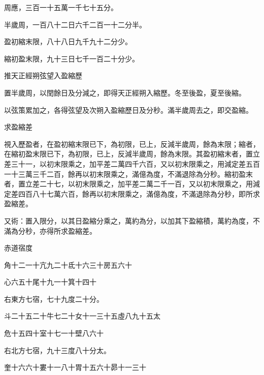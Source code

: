 \begin{pinyinscope}
 周應，三百一十五萬一千七十五分。



 半歲周，一百八十二日六千二百一十二分半。



 盈初縮末限，八十八日九千九十二分少。



 縮初盈末限，九十三日七千一百二十分少。



 推天正經朔弦望入盈縮歷



 置半歲周，以閏餘日及分減之，即得天正經朔入縮歷。冬至後盈，夏至後縮。



 以弦策累加之，各得弦望及次朔入盈縮歷日及分秒。滿半歲周去之，即交盈縮。



 求盈縮差



 視入歷盈者，在盈初縮末限已下，為初限，已上，反減半歲周，餘為末限；縮者，在縮初盈末限已下，為初限，已上，反減半歲周，餘為末限。其盈初縮末者，置立差三十一，以初末限乘之，加平差二萬四千六百，又以初末限乘之，用減定差五百一十三萬三千二百，餘再以初末限乘之，滿億為度，不滿退除為分秒。縮初盈末者，置立差二十七，以初末限乘之，加平差二萬二千一百，又以初末限乘之，用減定差四百八十七萬六百，餘再以初末限乘之，滿億為度，不滿退除為分秒，即所求盈縮差。



 又術：置入限分，以其日盈縮分乘之，萬約為分，以加其下盈縮積，萬約為度，不滿為分秒，亦得所求盈縮差。



 赤道宿度



 角十二一十亢九二十氐十六三十房五六十



 心六五十尾十九一十箕十四十



 右東方七宿，七十九度二十分。



 斗二十五二十牛七二十女十一三十五虛八九十五太



 危十五四十室十七一十壁八六十



 右北方七宿，九十三度八十分太。



 奎十六六十婁十一八十胃十五六十昴十一三十




\end{pinyinscope}
